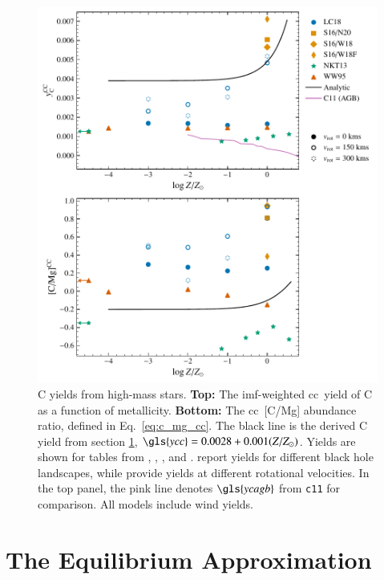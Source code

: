\documentclass[12pt,oneside,letterpaper]{report}
\newcommand{\cc}{\gls{cc}}
\newcommand{\imf}{\gls{imf}}
\newcommand{\cxi}{\texttt{\gls{c11}}}
\newcommand{\Ycc}{\gls{ycc}}
\newcommand{\Ycagb}{\gls{ycagb}}
\begin{document}
\begin{figure}[htp]
    \centering
    \includegraphics{y_c_cc.pdf}
    \caption[Massive star C yields]{
        C yields from high-mass stars.
        \textbf{Top:} The \imf-weighted \cc\ yield of C as a function of metallicity.
        \textbf{Bottom:} The \cc\ [C/Mg] abundance ratio, defined in Eq.~\ref{eq:c_mg_cc}. The black line is the derived C yield from section \ref{sec:equilibrium},
    $\Ycc = 0.0028 + 0.001 (Z/Z_{\odot})$. Yields are shown for tables from 
    \citet[red triangles]{WW95}, \citet[orange squares and diamonds]{sukhbold+16}, 
    \citet[green stars]{NKT13}, and \citet[blue circles]{LC18}. \citet{sukhbold+16} report yields for different black hole landscapes, while \citet{LC18} provide yields at different rotational velocities.
    In the top panel, the pink line denotes $\Ycagb$ from \cxi{} for comparison. All models include wind yields.
}
    \label{fig:y_cc}
\end{figure}

\chapter{The Equilibrium Approximation}\label{sec:equilibrium}
\end{document}
